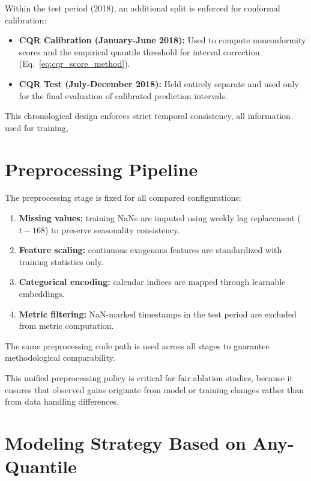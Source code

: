 Within the test period (2018), an additional split is enforced for conformal calibration:

\begin{itemize}
  \item \textbf{CQR Calibration (January-June 2018):} Used to compute nonconformity scores and the empirical quantile threshold for interval correction (Eq.~\ref{eq:cqr_score_method}).
  \item \textbf{CQR Test (July-December 2018):} Held entirely separate and used only for the final evaluation of calibrated prediction intervals.
\end{itemize}

This chronological design enforces strict temporal consistency, all information used for training,

\section{Preprocessing Pipeline}
\label{sec:preprocess}

The preprocessing stage is fixed for all compared configurations:

\begin{enumerate}
  \item \textbf{Missing values:} training NaNs are imputed using weekly
        lag replacement ($t-168$) to preserve seasonality consistency.
  \item \textbf{Feature scaling:} continuous exogenous features are
        standardized with training statistics only.
  \item \textbf{Categorical encoding:} calendar indices are mapped through
        learnable embeddings.
  \item \textbf{Metric filtering:} NaN-marked timestamps in the test period
        are excluded from metric computation.
\end{enumerate}

The same preprocessing code path is used across all stages to guarantee
methodological comparability.

This unified preprocessing policy is critical for fair ablation studies,
because it ensures that observed gains originate from model or training
changes rather than from data handling differences.

\section{Modeling Strategy Based on Any-Quantile}
\label{sec:modeling_strategy}

